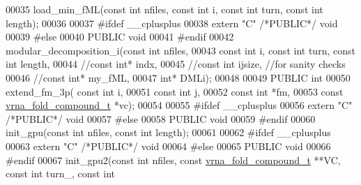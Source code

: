 \begin{DoxyCode}
00035 load\_min\_fML(\textcolor{keyword}{const} \textcolor{keywordtype}{int} nfiles, \textcolor{keyword}{const} \textcolor{keywordtype}{int} i, \textcolor{keyword}{const} \textcolor{keywordtype}{int} turn, \textcolor{keyword}{const} \textcolor{keywordtype}{int} length);
00036 
00037 \textcolor{preprocessor}{#ifdef \_\_cplusplus}
00038 \textcolor{keyword}{extern} \textcolor{stringliteral}{"C"} \textcolor{comment}{/*PUBLIC*/} \textcolor{keywordtype}{void}
00039 \textcolor{preprocessor}{#else}
00040 PUBLIC \textcolor{keywordtype}{void}
00041 \textcolor{preprocessor}{#endif}
00042 modular\_decomposition\_i(\textcolor{keyword}{const} \textcolor{keywordtype}{int} nfiles,
00043       \textcolor{keyword}{const} \textcolor{keywordtype}{int} i, \textcolor{keyword}{const} \textcolor{keywordtype}{int} turn, \textcolor{keyword}{const} \textcolor{keywordtype}{int} length,
00044           \textcolor{comment}{//const int* indx,}
00045           \textcolor{comment}{//const int ijsize,  //for sanity checks}
00046           \textcolor{comment}{//const int* my\_fML,}
00047       \textcolor{keywordtype}{int}* DMLi);
00048 
00049 PUBLIC \textcolor{keywordtype}{int}
00050 extend\_fm\_3p( \textcolor{keyword}{const} \textcolor{keywordtype}{int} i,
00051               \textcolor{keyword}{const} \textcolor{keywordtype}{int} j,
00052               \textcolor{keyword}{const} \textcolor{keywordtype}{int} *fm,
00053               \textcolor{keyword}{const} \mbox{\hyperlink{group__fold__compound_structvrna__fc__s}{vrna\_fold\_compound\_t}} *vc);
00054 
00055 \textcolor{preprocessor}{#ifdef \_\_cplusplus}
00056 \textcolor{keyword}{extern} \textcolor{stringliteral}{"C"} \textcolor{comment}{/*PUBLIC*/} \textcolor{keywordtype}{void}
00057 \textcolor{preprocessor}{#else}
00058 PUBLIC \textcolor{keywordtype}{void}
00059 \textcolor{preprocessor}{#endif}
00060 init\_gpu(\textcolor{keyword}{const} \textcolor{keywordtype}{int} nfiles, \textcolor{keyword}{const} \textcolor{keywordtype}{int} length);
00061 
00062 \textcolor{preprocessor}{#ifdef \_\_cplusplus}
00063 \textcolor{keyword}{extern} \textcolor{stringliteral}{"C"} \textcolor{comment}{/*PUBLIC*/} \textcolor{keywordtype}{void}
00064 \textcolor{preprocessor}{#else}
00065 PUBLIC \textcolor{keywordtype}{void}
00066 \textcolor{preprocessor}{#endif}
00067 init\_gpu2(\textcolor{keyword}{const} \textcolor{keywordtype}{int} nfiles, \textcolor{keyword}{const} \mbox{\hyperlink{group__fold__compound_structvrna__fc__s}{vrna\_fold\_compound\_t}} **VC, \textcolor{keyword}{const} \textcolor{keywordtype}{int} turn\_, \textcolor{keyword}{const} \textcolor{keywordtype}{int}

\end{DoxyCode}
